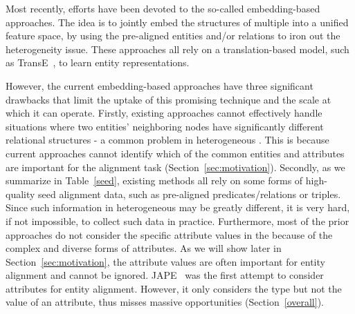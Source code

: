 	Most recently, efforts have been devoted to the so-called \KG embedding-based approaches. The idea is to jointly embed the structures
of multiple \KGs into a unified feature space, by using the pre-aligned entities and/or relations to iron out the heterogeneity issue.
These approaches all rely on a translation-based model, such as TransE~\cite{bordes2013translating}, to learn entity representations.

However, the current \KG embedding-based approaches have three significant drawbacks that limit the uptake of this promising technique and
the scale at which it can operate. Firstly, existing approaches cannot effectively handle situations where two entities' neighboring nodes
have significantly different relational structures - a common problem in heterogeneous \KGs. This is because current approaches cannot
identify which of the common entities and attributes are important for the alignment task (Section~\ref{sec:motivation}). Secondly, as we
summarize in Table~\ref{seed}, existing methods all rely on some forms of high-quality seed alignment data, such as pre-aligned \KG
predicates/relations or triples. Since such information in heterogeneous \KGs may be greatly different, it is very hard, if not impossible,
to collect such data in practice. Furthermore, most of the prior approaches do not consider the specific attribute values in the \KGs
because of the complex and diverse forms of attributes. As we will show later in Section~\ref{sec:motivation}, the attribute values are
often important for entity alignment and cannot be ignored. JAPE~\cite{sun2017cross} was the first attempt to consider attributes for
entity alignment. However, it only considers the type but not the value of an attribute, thus misses massive opportunities
(Section~\ref{overall}).


